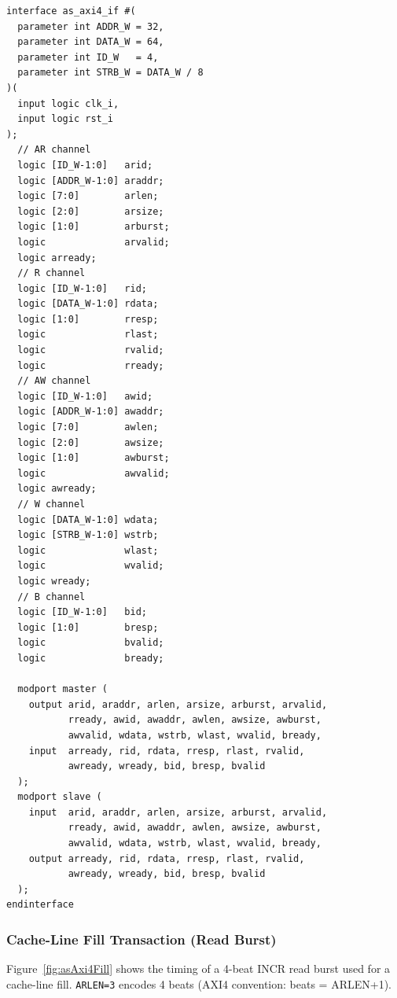 \begin{verbatim}
interface as_axi4_if #(
  parameter int ADDR_W = 32,
  parameter int DATA_W = 64,
  parameter int ID_W   = 4,
  parameter int STRB_W = DATA_W / 8
)(
  input logic clk_i,
  input logic rst_i
);
  // AR channel
  logic [ID_W-1:0]   arid;    
  logic [ADDR_W-1:0] araddr;
  logic [7:0]        arlen;   
  logic [2:0]        arsize;
  logic [1:0]        arburst; 
  logic              arvalid; 
  logic arready;
  // R channel
  logic [ID_W-1:0]   rid;     
  logic [DATA_W-1:0] rdata;
  logic [1:0]        rresp;   
  logic              rlast;
  logic              rvalid;  
  logic              rready;
  // AW channel
  logic [ID_W-1:0]   awid;    
  logic [ADDR_W-1:0] awaddr;
  logic [7:0]        awlen;   
  logic [2:0]        awsize;
  logic [1:0]        awburst; 
  logic              awvalid; 
  logic awready;
  // W channel
  logic [DATA_W-1:0] wdata;   
  logic [STRB_W-1:0] wstrb;
  logic              wlast;   
  logic              wvalid; 
  logic wready;
  // B channel
  logic [ID_W-1:0]   bid;     
  logic [1:0]        bresp;
  logic              bvalid;  
  logic              bready;

  modport master (
    output arid, araddr, arlen, arsize, arburst, arvalid, 
           rready, awid, awaddr, awlen, awsize, awburst, 
           awvalid, wdata, wstrb, wlast, wvalid, bready,
    input  arready, rid, rdata, rresp, rlast, rvalid,
           awready, wready, bid, bresp, bvalid
  );
  modport slave (
    input  arid, araddr, arlen, arsize, arburst, arvalid, 
           rready, awid, awaddr, awlen, awsize, awburst, 
           awvalid, wdata, wstrb, wlast, wvalid, bready,
    output arready, rid, rdata, rresp, rlast, rvalid,
           awready, wready, bid, bresp, bvalid
  );
endinterface
\end{verbatim}

\subsubsection{Cache-Line Fill Transaction (Read Burst)}

Figure~\ref{fig:asAxi4Fill} shows the timing of a 4-beat INCR read burst
used for a cache-line fill.
\texttt{ARLEN=3} encodes 4 beats (AXI4 convention: beats = ARLEN+1).

